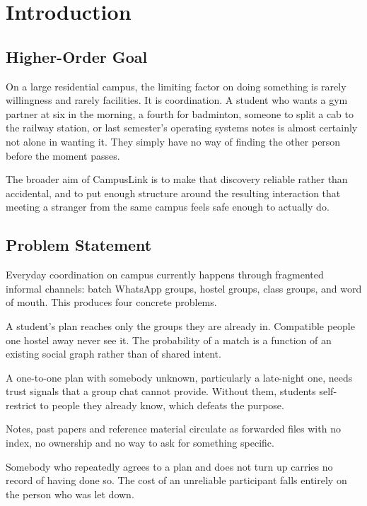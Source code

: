 \documentclass[twoside,12pt]{tietreport}
\author{%
  \texttt{1024030968} Govind \\
  \texttt{1024030096} Ashish Bajaj \\
  \texttt{ROLLNO3} Teammate Name%
}
\begin{document}
\maketitle
\tableofcontents
\listoffigures

\chapter{Introduction}

\section{Higher-Order Goal}

On a large residential campus, the limiting factor on doing something is rarely
willingness and rarely facilities. It is coordination. A student who wants a gym
partner at six in the morning, a fourth for badminton, someone to split a cab to
the railway station, or last semester's operating systems notes is almost
certainly not alone in wanting it. They simply have no way of finding the other
person before the moment passes.

The broader aim of CampusLink is to make that discovery reliable rather than
accidental, and to put enough structure around the resulting interaction that
meeting a stranger from the same campus feels safe enough to actually do.

\section{Problem Statement}

Everyday coordination on campus currently happens through fragmented informal
channels: batch WhatsApp groups, hostel groups, class groups, and word of mouth.
This produces four concrete problems.

\begin{description}[leftmargin=1.6cm,style=nextline]
  \item[Limited reach] A student's plan reaches only the groups they are already
    in. Compatible people one hostel away never see it. The probability of a
    match is a function of an existing social graph rather than of shared intent.
  \item[No structure for interaction between strangers] A one-to-one plan with
    somebody unknown, particularly a late-night one, needs trust signals that a
    group chat cannot provide. Without them, students self-restrict to people
    they already know, which defeats the purpose.
  \item[Inefficient resource sharing] Notes, past papers and reference material
    circulate as forwarded files with no index, no ownership and no way to ask
    for something specific.
  \item[No accountability] Somebody who repeatedly agrees to a plan and does not
    turn up carries no record of having done so. The cost of an unreliable
    participant falls entirely on the person who was let down.
\end{description}
\end{document}

